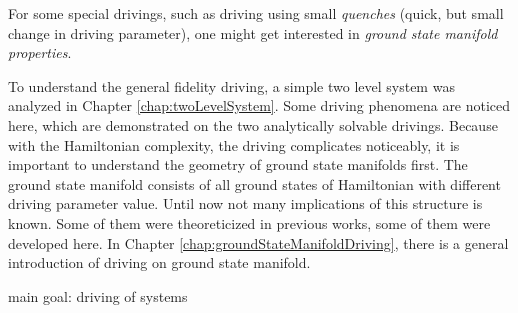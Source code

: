 For some special drivings, such as driving using small \emph{quenches} (quick, but small change in driving parameter), one might get interested in \emph{ground state manifold properties}.

To understand the general fidelity driving, a simple two level system was analyzed in Chapter \ref{chap:twoLevelSystem}. Some driving phenomena are noticed here, which are demonstrated on the two analytically solvable drivings. Because with the Hamiltonian complexity, the driving complicates noticeably, it is important to understand the geometry of ground state manifolds first. The ground state manifold consists of all ground states of Hamiltonian with different driving parameter value. Until now not many implications of this structure is known. Some of them were theoreticized in previous works, some of them were developed here. In Chapter \ref{chap:groundStateManifoldDriving}, there is a general introduction of driving on ground state manifold. 




main goal: driving of systems